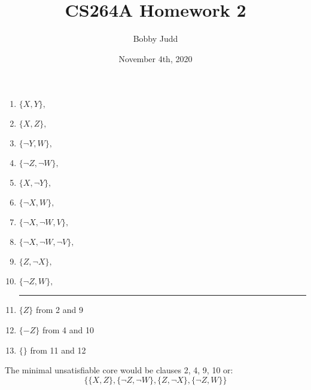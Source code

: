 \documentclass{article}
\title{CS264A Homework 2}
\author{Bobby Judd}
\date{November 4th, 2020}
\begin{document}
\maketitle

\clearpage
\section{}
\begin{enumerate}
    \item $\{X, Y\},$
    \item $\{X, Z\},$
    \item $\{\lnot Y, W\},$
    \item $\{\lnot Z, \lnot W\},$
    \item $\{X, \lnot Y\},$
    \item $\{\lnot X, W\},$
    \item $\{\lnot X, \lnot W, V\},$
    \item $\{\lnot X, \lnot W, \lnot V\},$
    \item $\{Z, \lnot X\},$
    \item $\{\lnot Z, W\},$
    \newline
    \noindent\rule{4cm}{0.4pt}
    \item $\{Z\}$ \quad from 2 and 9
    \item $\{-Z\}$ \quad from 4 and 10
    \item $\{\}$ \quad from 11 and 12
\end{enumerate}
The minimal unsatisfiable core would be clauses 2, 4, 9, 10 or:
\[\{\{X, Z\}, \{\lnot Z, \lnot W\}, \{Z, \lnot X\}, \{\lnot Z, W\}\}\]

\clearpage
\section{}

\clearpage
\section{}
 \clearpage
 \section{}
 
 \clearpage
 \section{}
 
 \clearpage
 \section{}

 
 \clearpage
 \section{}

\clearpage
\section{}

\clearpage
\section{}

\clearpage
\section{}
\end{document}
